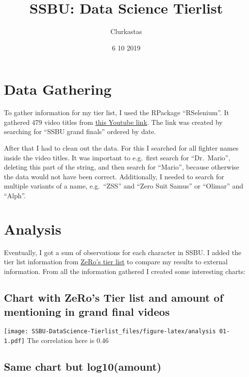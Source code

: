 \documentclass[]{article}
\title{SSBU: Data Science Tierlist}
\author{Clurkastas}
\date{6 10 2019}
\begin{document}
\maketitle

\hypertarget{data-gathering}{%
\section{Data Gathering}\label{data-gathering}}

To gather information for my tier list, I used the RPackage
``RSelenium''. It gathered 479 video titles from
\href{\%22https://www.youtube.com/results?search_query=ssbu+grand+finals\&sp=CAI\%253D\%22}{this
Youtube link}. The link was created by searching for ``SSBU grand
finals'' ordered by date.

After that I had to clean out the data. For this I searched for all
fighter names inside the video titles. It was important to e.g.~first
search for ``Dr.~Mario'', deleting this part of the string, and then
search for ``Mario'', because otherwise the data would not have been
correct. Additionally, I needed to search for multiple variants of a
name, e.g.~``ZSS'' and ``Zero Suit Samus'' or ``Olimar'' and ``Alph''.

\hypertarget{analysis}{%
\section{Analysis}\label{analysis}}

Eventually, I got a sum of observations for each character in SSBU. I
added the tier list information from
\href{https://smash-tier-list.com/ultimate}{ZeRo's tier list} to compare
my results to external information. From all the information gathered I
created some interesting charts:

\hypertarget{chart-with-zeros-tier-list-and-amount-of-mentioning-in-grand-final-videos}{%
\subsection{Chart with ZeRo's Tier list and amount of mentioning in
grand final
videos}\label{chart-with-zeros-tier-list-and-amount-of-mentioning-in-grand-final-videos}}

\texttt{[image: SSBU-DataScience-Tierlist\_files/figure-latex/analysis 01-1.pdf]}
The correlation here is 0.46

\hypertarget{same-chart-but-log10amount}{%
\subsection{Same chart but
log10(amount)}\label{same-chart-but-log10amount}}
\end{document}
